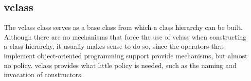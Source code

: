 %
%
%
%
%

\subsection{vclass}
\label{sec:vclass}

The vclass class serves as a base class from which a class hierarchy can be
built.  Although there are no mechanisms that force the use of vclass when
constructing a class hierarchy, it usually makes sense to do so, since the
operators that implement object-oriented programming support provide mechanisms,
but almost no policy.  vclass provides what little policy is needed, such as the
naming and invocation of constructors.

